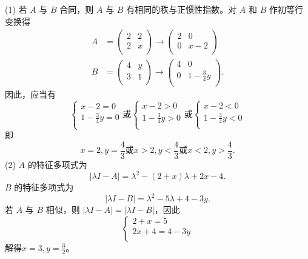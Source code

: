 \begin{enumerate}[1~]
\begin{solution}
(1) 若 $A$ 与 $B$ 合同，则 $A$ 与 $B$ 有相同的秩与正惯性指数。对 $A$ 和 $B$ 作初等行变换得\begin{align*}
A&=\left( \begin{matrix}
	2&		2\\
	2&		x\\
\end{matrix} \right) \rightarrow \left( \begin{matrix}
	2&		0\\
	0&		x-2\\
\end{matrix} \right) \\
B&=\left( \begin{matrix}
	4&		y\\
	3&		1\\
\end{matrix} \right) \rightarrow \left( \begin{matrix}
	4&		0\\
	0&		1-\frac{3}{4}y\\
\end{matrix} \right) .
\end{align*}
因此，应当有\[
\left\{ \begin{array}{l}
	x-2=0\\
	1-\frac{3}{4}y=0\\
\end{array}\text{或}\left\{ \begin{array}{l}
	x-2>0\\
	1-\frac{3}{4}y>0\\
\end{array}\text{或}\left\{ \begin{array}{l}
	x-2<0\\
	1-\frac{3}{4}y<0\\
\end{array} \right. \right. \right. 
\]
即\[
x=2,y=\frac{4}{3}\text{或}x>2,y<\frac{4}{3}\text{或}x<2,y>\frac{4}{3}.
\]
(2) $A$ 的特征多项式为\[
|\lambda I-A|=\lambda ^2-\left( 2+x \right) \lambda +2x-4.
\]
$B$ 的特征多项式为\[
|\lambda I-B|=\lambda ^2 - 5 \lambda + 4 - 3 y.
\]
若 $A$ 与 $B$ 相似，则 $|\lambda I-A|=|\lambda I-B|$，因此\[
\left\{ \begin{array}{l}
	2+x=5\\
	2x+4=4-3y\\
\end{array} \right. 
\]
解得$x=3, y=\frac{3}{2}$。
\end{solution}


\end{enumerate}
